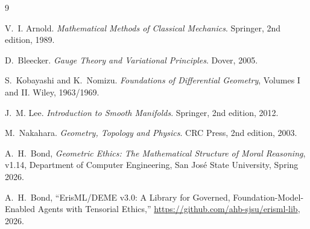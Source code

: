 \documentclass[12pt]{article}
\theoremstyle{definition}
\theoremstyle{remark}
\begin{document}

\begin{thebibliography}{9}

V.~I. Arnold.
\newblock \emph{Mathematical Methods of Classical Mechanics}.
\newblock Springer, 2nd edition, 1989.

D.~Bleecker.
\newblock \emph{Gauge Theory and Variational Principles}.
\newblock Dover, 2005.

S.~Kobayashi and K.~Nomizu.
\newblock \emph{Foundations of Differential Geometry}, Volumes I and II.
\newblock Wiley, 1963/1969.

J.~M. Lee.
\newblock \emph{Introduction to Smooth Manifolds}.
\newblock Springer, 2nd edition, 2012.

M.~Nakahara.
\newblock \emph{Geometry, Topology and Physics}.
\newblock CRC Press, 2nd edition, 2003.

A.~H.~Bond, \emph{Geometric Ethics: The Mathematical Structure of Moral Reasoning}, v1.14, Department of Computer Engineering, San Jos\'e State University, Spring 2026.

A.~H.~Bond, ``ErisML/DEME v3.0: A Library for Governed, Foundation-Model-Enabled Agents with Tensorial Ethics,'' \url{https://github.com/ahb-sjsu/erisml-lib}, 2026.

\end{thebibliography}
\end{document}
